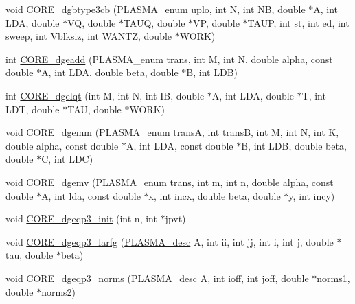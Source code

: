 \begin{DoxyCompactItemize}
\item 
void \hyperlink{group__CORE__double_ga7e6f6499c138a6d38ed8a0908ddee64c_ga7e6f6499c138a6d38ed8a0908ddee64c}{C\+O\+R\+E\+\_\+dgbtype3cb} (P\+L\+A\+S\+M\+A\+\_\+enum uplo, int N, int N\+B, double $\ast$A, int L\+D\+A, double $\ast$V\+Q, double $\ast$T\+A\+U\+Q, double $\ast$V\+P, double $\ast$T\+A\+U\+P, int st, int ed, int sweep, int Vblksiz, int W\+A\+N\+T\+Z, double $\ast$W\+O\+R\+K)
\item 
int \hyperlink{group__CORE__double_gaca52e4d3203bb82422d184f8970b9968_gaca52e4d3203bb82422d184f8970b9968}{C\+O\+R\+E\+\_\+dgeadd} (P\+L\+A\+S\+M\+A\+\_\+enum trans, int M, int N, double alpha, const double $\ast$A, int L\+D\+A, double beta, double $\ast$B, int L\+D\+B)
\item 
int \hyperlink{group__CORE__double_ga2bff35db3d30069fcb9fde474e642f03_ga2bff35db3d30069fcb9fde474e642f03}{C\+O\+R\+E\+\_\+dgelqt} (int M, int N, int I\+B, double $\ast$A, int L\+D\+A, double $\ast$T, int L\+D\+T, double $\ast$T\+A\+U, double $\ast$W\+O\+R\+K)
\item 
void \hyperlink{group__CORE__double_ga0f4f7fdf0eb156d55c71386eb1b76d1e_ga0f4f7fdf0eb156d55c71386eb1b76d1e}{C\+O\+R\+E\+\_\+dgemm} (P\+L\+A\+S\+M\+A\+\_\+enum trans\+A, int trans\+B, int M, int N, int K, double alpha, const double $\ast$A, int L\+D\+A, const double $\ast$B, int L\+D\+B, double beta, double $\ast$C, int L\+D\+C)
\item 
void \hyperlink{group__CORE__double_gad5d21bddba2726e03cf218681e559d36_gad5d21bddba2726e03cf218681e559d36}{C\+O\+R\+E\+\_\+dgemv} (P\+L\+A\+S\+M\+A\+\_\+enum trans, int m, int n, double alpha, const double $\ast$A, int lda, const double $\ast$x, int incx, double beta, double $\ast$y, int incy)
\item 
void \hyperlink{group__CORE__double_ga04c474827ce4bd9af88919a8734dd6e7_ga04c474827ce4bd9af88919a8734dd6e7}{C\+O\+R\+E\+\_\+dgeqp3\+\_\+init} (int n, int $\ast$jpvt)
\item 
void \hyperlink{group__CORE__double_ga1ada7f30a1198540065ca3393f27ea73_ga1ada7f30a1198540065ca3393f27ea73}{C\+O\+R\+E\+\_\+dgeqp3\+\_\+larfg} (\hyperlink{structplasma__desc__t}{P\+L\+A\+S\+M\+A\+\_\+desc} A, int ii, int jj, int i, int j, double $\ast$tau, double $\ast$beta)
\item 
void \hyperlink{group__CORE__double_gae0c64547ad5f825af9af811b583ea231_gae0c64547ad5f825af9af811b583ea231}{C\+O\+R\+E\+\_\+dgeqp3\+\_\+norms} (\hyperlink{structplasma__desc__t}{P\+L\+A\+S\+M\+A\+\_\+desc} A, int ioff, int joff, double $\ast$norms1, double $\ast$norms2)

\end{DoxyCompactItemize}
